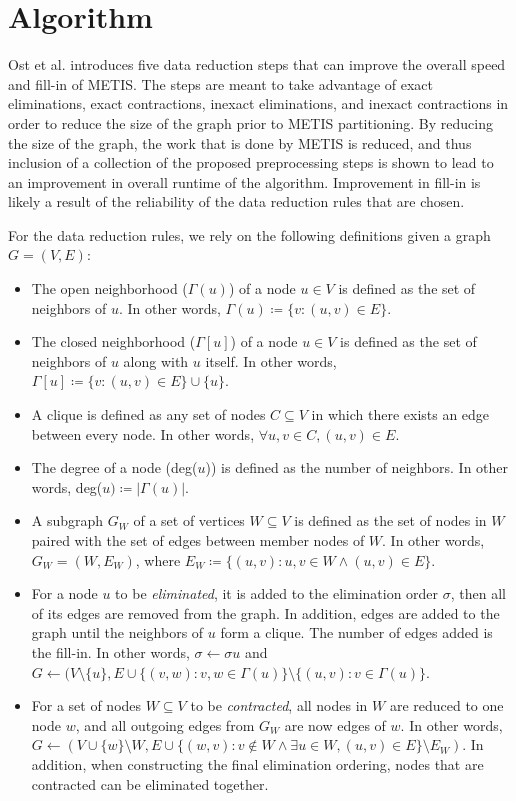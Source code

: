 \documentclass[final]{siamart250211}
\begin{document}
\section{Algorithm}
\label{sec:d}
Ost et al. \cite{OsScSt20} introduces five data reduction steps that can improve the overall speed and fill-in of METIS. The steps are meant to take advantage of exact eliminations, exact contractions, inexact eliminations, and inexact contractions in order to reduce the size of the graph prior to METIS partitioning. By reducing the size of the graph, the work that is done by METIS is reduced, and thus inclusion of a collection of the proposed preprocessing steps is shown to lead to an improvement in overall runtime of the algorithm. Improvement in fill-in is likely a result of the reliability of the data reduction rules that are chosen.

For the data reduction rules, we rely on the following definitions given a graph $G=(V, E)$:
\begin{itemize}
    \item The open neighborhood ($\Gamma(u)$) of a node $u\in V$ is defined as the set of neighbors of $u$. In other words, $\Gamma(u) \coloneq \{v: (u, v) \in E\}  $.
    \item The closed neighborhood ($\Gamma[u]$) of a node $u\in V$ is defined as the set of neighbors of $u$ along with $u$ itself. In other words, $\Gamma[u] \coloneq \{v: (u, v) \in E\} \cup \{u\} $.
    \item A clique is defined as any set of nodes $C \subseteq V$ in which there exists an edge between every node. In other words, $\forall u, v \in C, (u, v) \in E$.
    \item The degree of a node (deg($u$)) is defined as the number of neighbors. In other words, deg($u) \coloneq |\Gamma(u)|$.
    \item A subgraph $G_W$ of a set of vertices $W \subseteq V$ is defined as the set of nodes in $W$ paired with the set of edges between member nodes of $W$. In other words, $G_W = (W, E_W)$, where $E_W \coloneq \{(u, v): u, v \in W \land (u, v) \in E\}$.
    \item For a node $u$ to be \textit{eliminated}, it is added to the elimination order $\sigma$, then all of its edges are removed from the graph. In addition, edges are added to the graph until the neighbors of $u$ form a clique. The number of edges added is the fill-in. In other words, $\sigma \leftarrow \sigma u$ and $G \leftarrow (V\setminus\{u\}, E \cup \{(v, w) : v, w \in \Gamma(u) \} \setminus\{(u, v) : v \in \Gamma(u) \}$.
    \item For a set of nodes $W\subseteq V$ to be \textit{contracted}, all nodes in $W$ are reduced to one node $w$, and all outgoing edges from $G_W$ are now edges of $w$. In other words, $G \leftarrow (V \cup \{w\}\setminus W, E \cup \{(w, v) : v\notin W \land \exists u\in W, (u, v)\in E \} \setminus E_W)$. In addition, when constructing the final elimination ordering, nodes that are contracted can be eliminated together.
\end{itemize}
\end{document}
